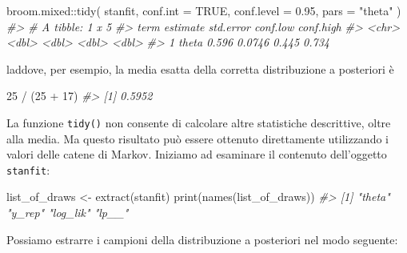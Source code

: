 \documentclass[
  11pt,
]{krantz}
\makeatletter
\newenvironment{Shaded}{\begin{snugshade}}{\end{snugshade}}
\newcommand{\AttributeTok}[1]{\textcolor[rgb]{0.61,0.61,0.61}{#1}}
\newcommand{\CommentTok}[1]{\textcolor[rgb]{0.37,0.37,0.37}{\textit{#1}}}
\newcommand{\ConstantTok}[1]{\textcolor[rgb]{0,0,0}{#1}}
\newcommand{\DecValTok}[1]{\textcolor[rgb]{0.06,0.06,0.06}{#1}}
\newcommand{\FloatTok}[1]{\textcolor[rgb]{0.06,0.06,0.06}{#1}}
\newcommand{\FunctionTok}[1]{\textcolor[rgb]{0,0,0}{#1}}
\newcommand{\NormalTok}[1]{#1}
\newcommand{\OtherTok}[1]{\textcolor[rgb]{0.37,0.37,0.37}{#1}}
\newcommand{\SpecialCharTok}[1]{\textcolor[rgb]{0,0,0}{#1}}
\newcommand{\StringTok}[1]{\textcolor[rgb]{0.5,0.5,0.5}{#1}}
\newenvironment{kframe}{%
\medskip{}
\setlength{\fboxsep}{.8em}
 \def\at@end@of@kframe{}%
 \ifinner\ifhmode%
  \def\at@end@of@kframe{\end{minipage}}%
  \begin{minipage}{\columnwidth}%
 \fi\fi%
 \def\FrameCommand##1{\hskip\@totalleftmargin \hskip-\fboxsep
 \colorbox{shadecolor}{##1}\hskip-\fboxsep
     \hskip-\linewidth \hskip-\@totalleftmargin \hskip\columnwidth}%
 \MakeFramed {\advance\hsize-\width
   \@totalleftmargin\z@ \linewidth\hsize
   \@setminipage}}%
 {\par\unskip\endMakeFramed%
 \at@end@of@kframe}
\renewenvironment{Shaded}{\begin{kframe}}{\end{kframe}}
\theoremstyle{definition}
\theoremstyle{definition}
\theoremstyle{definition}
\theoremstyle{definition}
\theoremstyle{remark}
\makeatother
\begin{document}
\begin{Shaded}
\begin{Highlighting}[]
\NormalTok{broom.mixed}\SpecialCharTok{::}\FunctionTok{tidy}\NormalTok{(}
\NormalTok{  stanfit, }
  \AttributeTok{conf.int =} \ConstantTok{TRUE}\NormalTok{, }
  \AttributeTok{conf.level =} \FloatTok{0.95}\NormalTok{, }
  \AttributeTok{pars =} \StringTok{"theta"}
\NormalTok{)}
\CommentTok{\#\textgreater{} \# A tibble: 1 x 5}
\CommentTok{\#\textgreater{}   term  estimate std.error conf.low conf.high}
\CommentTok{\#\textgreater{}   \textless{}chr\textgreater{}    \textless{}dbl\textgreater{}     \textless{}dbl\textgreater{}    \textless{}dbl\textgreater{}     \textless{}dbl\textgreater{}}
\CommentTok{\#\textgreater{} 1 theta    0.596    0.0746    0.445     0.734}
\end{Highlighting}
\end{Shaded}

laddove, per esempio, la media esatta della corretta distribuzione a posteriori è

\begin{Shaded}
\begin{Highlighting}[]
\DecValTok{25} \SpecialCharTok{/}\NormalTok{ (}\DecValTok{25} \SpecialCharTok{+} \DecValTok{17}\NormalTok{)}
\CommentTok{\#\textgreater{} [1] 0.5952}
\end{Highlighting}
\end{Shaded}

La funzione \texttt{tidy()} non consente di calcolare altre statistiche descrittive, oltre alla media. Ma questo risultato può essere ottenuto direttamente utilizzando i valori delle catene di Markov. Iniziamo ad esaminare il contenuto dell'oggetto \texttt{stanfit}:

\begin{Shaded}
\begin{Highlighting}[]
\NormalTok{list\_of\_draws }\OtherTok{\textless{}{-}} \FunctionTok{extract}\NormalTok{(stanfit)}
\FunctionTok{print}\NormalTok{(}\FunctionTok{names}\NormalTok{(list\_of\_draws))}
\CommentTok{\#\textgreater{} [1] "theta"   "y\_rep"   "log\_lik" "lp\_\_"}
\end{Highlighting}
\end{Shaded}

Possiamo estrarre i campioni della distribuzione a posteriori nel modo seguente:

\begin{Shaded}
\end{Shaded}
\end{document}
